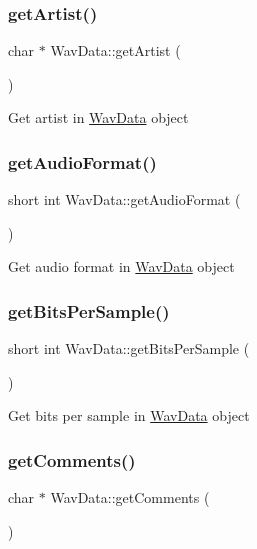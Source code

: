 \subsubsection{\texorpdfstring{get\+Artist()}{getArtist()}}
{\footnotesize\ttfamily char $\ast$ Wav\+Data\+::get\+Artist (\begin{DoxyParamCaption}{ }\end{DoxyParamCaption})}

Get artist in \hyperlink{classWavData}{Wav\+Data} object \mbox{\label{classWavData_a2ee1e47a093e5833807e98d246c81d98}} 
\subsubsection{\texorpdfstring{get\+Audio\+Format()}{getAudioFormat()}}
{\footnotesize\ttfamily short int Wav\+Data\+::get\+Audio\+Format (\begin{DoxyParamCaption}{ }\end{DoxyParamCaption})}

Get audio format in \hyperlink{classWavData}{Wav\+Data} object \mbox{\label{classWavData_aa841d005b1060f436a28e032626745fa}} 
\subsubsection{\texorpdfstring{get\+Bits\+Per\+Sample()}{getBitsPerSample()}}
{\footnotesize\ttfamily short int Wav\+Data\+::get\+Bits\+Per\+Sample (\begin{DoxyParamCaption}{ }\end{DoxyParamCaption})}

Get bits per sample in \hyperlink{classWavData}{Wav\+Data} object \mbox{\label{classWavData_a0db7155cf6cfe94c87b22fcb148fa349}} 
\subsubsection{\texorpdfstring{get\+Comments()}{getComments()}}
{\footnotesize\ttfamily char $\ast$ Wav\+Data\+::get\+Comments (\begin{DoxyParamCaption}{ }\end{DoxyParamCaption})}

